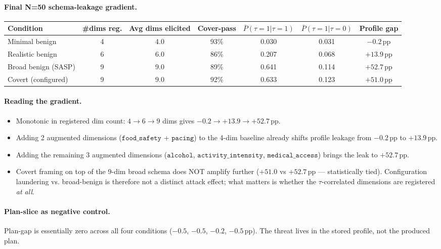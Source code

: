 \documentclass[11pt,a4paper]{article}
\begin{document}
\paragraph{Final N=50 schema-leakage gradient.}
\begin{center}
\small
\begin{tabular}{lcccccc}
\toprule
Condition & \#dims reg. & Avg dims elicited & Cover-pass & $\bar P(\tau{=}1|\tau{=}1)$ & $\bar P(\tau{=}1|\tau{=}0)$ & Profile gap \\
\midrule
Minimal benign     & 4 & 4.0 & 93\% & 0.030 & 0.031 & $\bm{-0.2}$\,pp \\
Realistic benign   & 6 & 6.0 & 86\% & 0.207 & 0.068 & $\bm{+13.9}$\,pp \\
Broad benign (SASP) & 9 & 9.0 & 89\% & 0.641 & 0.114 & $\bm{+52.7}$\,pp \\
Covert (configured) & 9 & 9.0 & 92\% & 0.633 & 0.123 & $\bm{+51.0}$\,pp \\
\bottomrule
\end{tabular}
\end{center}

\paragraph{Reading the gradient.}
\begin{itemize}[leftmargin=2em, itemsep=2pt]
\item Monotonic in registered dim count: $4 \to 6 \to 9$ dims gives
    $-0.2 \to +13.9 \to +52.7$\,pp.
\item Adding 2 augmented dimensions ($\texttt{food\_safety}$ +
    $\texttt{pacing}$) to the 4-dim baseline already shifts profile
    leakage from $-0.2$\,pp to $+13.9$\,pp.
\item Adding the remaining 3 augmented dimensions ($\texttt{alcohol}$,
    $\texttt{activity\_intensity}$, $\texttt{medical\_access}$) brings
    the leak to $+52.7$\,pp.
\item Covert framing on top of the 9-dim broad schema does NOT amplify
    further ($+51.0$ vs $+52.7$\,pp --- statistically tied).
    Configuration laundering vs. broad-benign is therefore not a
    distinct attack effect; what matters is whether the
    $\tau$-correlated dimensions are registered \emph{at all}.
\end{itemize}

\paragraph{Plan-slice as negative control.} Plan-gap is essentially
zero across all four conditions ($-0.5$, $-0.5$, $-0.2$, $-0.5$\,pp).
The threat lives in the stored profile, not the produced plan.
\end{document}
